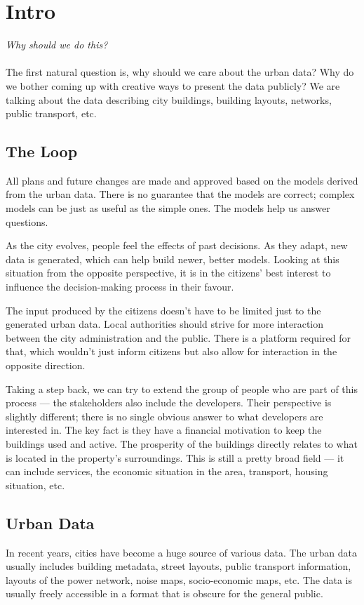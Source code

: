 \section{Intro}
\textit{Why should we do this?}

\paragraph{}The first natural question is, why should we care about the urban data? Why do we bother coming up with creative ways to present the data publicly? We are talking about the data describing city buildings, building layouts, networks, public transport, etc. 

\subsection{The Loop}

All plans and future changes are made and approved based on the models derived from the urban data. There is no guarantee that the models are correct; complex models can be just as useful as the simple ones. The models help us answer questions.

As the city evolves, people feel the effects of past decisions. As they adapt, new data is generated, which can help build newer, better models. Looking at this situation from the opposite perspective, it is in the citizens' best interest to influence the decision-making process in their favour. 

The input produced by the citizens doesn't have to be limited just to the generated urban data. Local authorities should strive for more interaction between the city administration and the public. There is a platform required for that, which wouldn't just inform citizens but also allow for interaction in the opposite direction. 

Taking a step back, we can try to extend the group of people who are part of this process --- the stakeholders also include the developers. Their perspective is slightly different; there is no single obvious answer to what developers are interested in. The key fact is they have a financial motivation to keep the buildings used and active. The prosperity of the buildings directly relates to what is located in the property's surroundings. This is still a pretty broad field --- it can include services, the economic situation in the area, transport, housing situation, etc. 

\subsection{Urban Data}
In recent years, cities have become a huge source of various data. The urban data usually includes building metadata, street layouts, public transport information, layouts of the power network, noise maps, socio-economic maps, etc. The data is usually freely accessible in a format that is obscure for the general public. 

